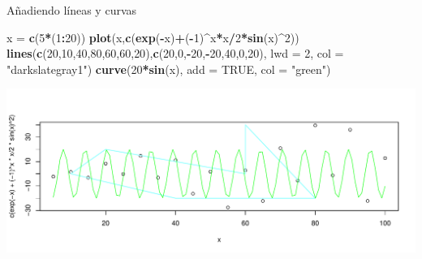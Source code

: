 \documentclass[
  ignorenonframetext,
]{beamer}
\newenvironment{Shaded}{\begin{snugshade}}{\end{snugshade}}
\newcommand{\AttributeTok}[1]{\textcolor[rgb]{0.13,0.29,0.53}{#1}}
\newcommand{\ConstantTok}[1]{\textcolor[rgb]{0.56,0.35,0.01}{#1}}
\newcommand{\DecValTok}[1]{\textcolor[rgb]{0.00,0.00,0.81}{#1}}
\newcommand{\FunctionTok}[1]{\textcolor[rgb]{0.13,0.29,0.53}{\textbf{#1}}}
\newcommand{\NormalTok}[1]{#1}
\newcommand{\OtherTok}[1]{\textcolor[rgb]{0.56,0.35,0.01}{#1}}
\newcommand{\SpecialCharTok}[1]{\textcolor[rgb]{0.81,0.36,0.00}{\textbf{#1}}}
\newcommand{\StringTok}[1]{\textcolor[rgb]{0.31,0.60,0.02}{#1}}
\begin{document}
\begin{frame}[fragile]{Añadiendo líneas y curvas}
\label{auxf1adiendo-luxedneas-y-curvas}
\begin{Shaded}
\begin{Highlighting}[]
\NormalTok{x }\OtherTok{=} \FunctionTok{c}\NormalTok{(}\DecValTok{5}\SpecialCharTok{*}\NormalTok{(}\DecValTok{1}\SpecialCharTok{:}\DecValTok{20}\NormalTok{))}
\FunctionTok{plot}\NormalTok{(x,}\FunctionTok{c}\NormalTok{(}\FunctionTok{exp}\NormalTok{(}\SpecialCharTok{{-}}\NormalTok{x)}\SpecialCharTok{+}\NormalTok{(}\SpecialCharTok{{-}}\DecValTok{1}\NormalTok{)}\SpecialCharTok{\^{}}\NormalTok{x}\SpecialCharTok{*}\NormalTok{x}\SpecialCharTok{/}\DecValTok{2}\SpecialCharTok{*}\FunctionTok{sin}\NormalTok{(x)}\SpecialCharTok{\^{}}\DecValTok{2}\NormalTok{))}
\FunctionTok{lines}\NormalTok{(}\FunctionTok{c}\NormalTok{(}\DecValTok{20}\NormalTok{,}\DecValTok{10}\NormalTok{,}\DecValTok{40}\NormalTok{,}\DecValTok{80}\NormalTok{,}\DecValTok{60}\NormalTok{,}\DecValTok{60}\NormalTok{,}\DecValTok{20}\NormalTok{),}\FunctionTok{c}\NormalTok{(}\DecValTok{20}\NormalTok{,}\DecValTok{0}\NormalTok{,}\SpecialCharTok{{-}}\DecValTok{20}\NormalTok{,}\SpecialCharTok{{-}}\DecValTok{20}\NormalTok{,}\DecValTok{40}\NormalTok{,}\DecValTok{0}\NormalTok{,}\DecValTok{20}\NormalTok{), }
      \AttributeTok{lwd =} \DecValTok{2}\NormalTok{, }\AttributeTok{col =} \StringTok{"darkslategray1"}\NormalTok{)}
\FunctionTok{curve}\NormalTok{(}\DecValTok{20}\SpecialCharTok{*}\FunctionTok{sin}\NormalTok{(x), }\AttributeTok{add =} \ConstantTok{TRUE}\NormalTok{, }\AttributeTok{col =} \StringTok{"green"}\NormalTok{)}
\end{Highlighting}
\end{Shaded}

\begin{center}\includegraphics[width=0.8\linewidth]{R_base_files/figure-beamer/unnamed-chunk-42-1} \end{center}
\end{frame}
\end{document}
